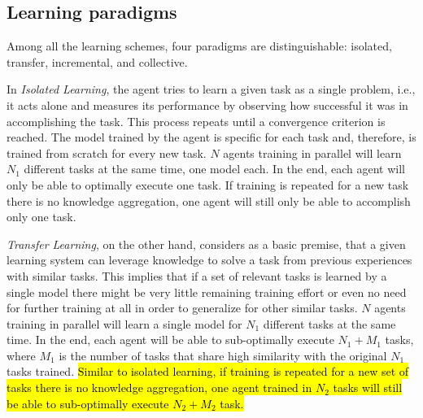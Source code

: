 \subsection{Learning paradigms}
Among all the learning schemes, four paradigms are distinguishable: isolated, transfer, incremental, and collective. 

In \textit{Isolated Learning}, the agent tries to learn a given task as a single problem, i.e., it acts alone and measures its performance by observing how successful it was in accomplishing the task. This process repeats until a convergence criterion is reached. The model trained by the agent is specific for each task and, therefore, is trained from scratch for every new task. $N$ agents training in parallel will learn $N_1$ different tasks at the same time, one model each. In the end, each agent will only be able to optimally execute one task. If training is repeated for a new task there is no knowledge aggregation, one agent will still only be able to accomplish only one task.

\textit{Transfer Learning}, on the other hand, considers as a basic premise, that a given learning system can leverage knowledge to solve a task from previous experiences with similar tasks. This implies that if a set of relevant tasks is learned by a single model there might be very little remaining training effort or even no need for further training at all in order to generalize for other similar tasks. $N$ agents training in parallel will learn a single model for $N_1$ different tasks at the same time. In the end, each agent will be able to sub-optimally execute $N_1+M_1$ tasks, where $M_1$ is the number of tasks that share high similarity with the original $N_1$ tasks trained. \hl{Similar to isolated learning, if training is repeated for a new set of tasks there is no knowledge aggregation, one agent trained in $N_2$ tasks will still be able to sub-optimally execute $N_2+M_2$ task.}     

